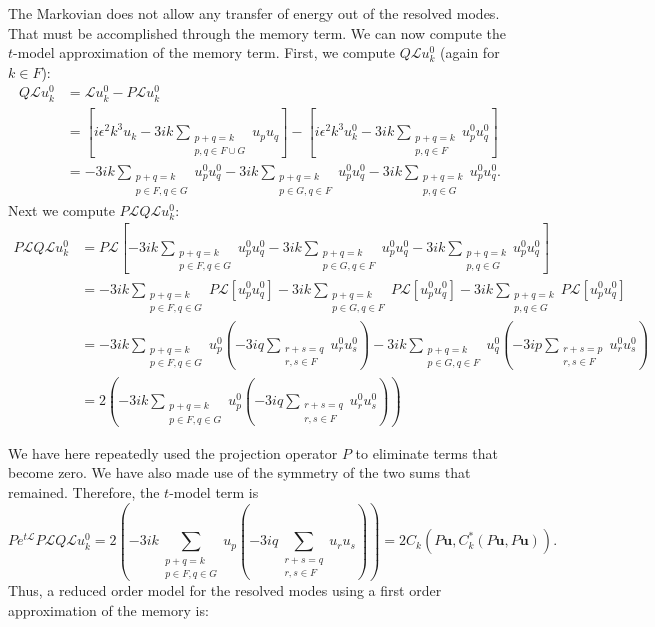 \documentclass{article}
\begin{document}
The Markovian does not allow any transfer of energy out of the resolved modes. That must be accomplished through the memory term. We can now compute the $t$-model approximation of the memory term. First, we compute $Q\mathcal{L}u_k^0$ (again for $k\in F$):
\begin{align*}
Q\mathcal{L}u_k^0 &= \mathcal{L}u_k^0-P\mathcal{L}u_k^0\\
&=\left[i\epsilon^2 k^3 u_k-3ik\sum_{\substack{p+q=k\\p,q\in F\cup G}}u_p u_q\right]-\left[i\epsilon^2 k^3u_k^0-3ik\sum_{\substack{p+q=k\\p,q\in F}}u_p^0 u_q^0\right]\\
&=-3ik\sum_{\substack{p+q=k\\p\in F,q\in G}}u_p^0 u_q^0-3ik\sum_{\substack{p+q=k\\p\in G,q\in F}}u_p^0 u_q^0-3ik\sum_{\substack{p+q=k\\p,q\in G}}u_p^0 u_q^0.
\end{align*}Next we compute $P\mathcal{L}Q\mathcal{L}u_k^0$:
\begin{align*}
P\mathcal{L}Q\mathcal{L}u_k^0&=P\mathcal{L}\left[-3ik\sum_{\substack{p+q=k\\p\in F,q\in G}}u_p^0 u_q^0-3ik\sum_{\substack{p+q=k\\p\in G,q\in F}}u_p^0 u_q^0-3ik\sum_{\substack{p+q=k\\p,q\in G}}u_p^0 u_q^0\right]\\
&=-3ik\sum_{\substack{p+q=k\\p\in F,q\in G}}P\mathcal{L}[u_p^0 u_q^0]-3ik\sum_{\substack{p+q=k\\p\in G,q\in F}}P\mathcal{L}[u_p^0 u_q^0]-3ik\sum_{\substack{p+q=k\\p,q\in G}}P\mathcal{L}[u_p^0 u_q^0]\\
&=-3ik\sum_{\substack{p+q=k\\p\in F,q\in G}}u_p^0\left(-3iq\sum_{\substack{r+s=q\\r,s\in F}}u_r^0u_s^0\right)-3ik\sum_{\substack{p+q=k\\p\in G,q\in F}}u_q^0\left(-3ip\sum_{\substack{r+s=p\\r,s\in F}}u_r^0u_s^0\right)\\
&=2\left(-3ik\sum_{\substack{p+q=k\\p\in F,q\in G}}u_p^0\left(-3iq\sum_{\substack{r+s=q\\r,s\in F}}u_r^0u_s^0\right)\right)
\end{align*}

We have here repeatedly used the projection operator $P$ to eliminate terms that become zero. We have also made use of the symmetry of the two sums that remained. Therefore, the $t$-model term is
\begin{equation}
Pe^{t\mathcal{L}}P\mathcal{L}Q\mathcal{L}u_k^0 = 2\left(-3ik\sum_{\substack{p+q=k\\p\in F,q\in G}}u_p\left(-3iq\sum_{\substack{r+s=q\\r,s\in F}}u_ru_s\right)\right) = 2C_k(P\mathbf{u},C_k^*(P\mathbf{u},P\mathbf{u})).
\end{equation}Thus, a reduced order model for the resolved modes using a first order approximation of the memory is:
\end{document}
